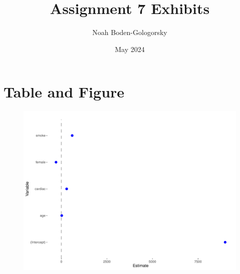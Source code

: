 \documentclass{article}
\title{Assignment 7 Exhibits}
\author{Noah Boden-Gologorsky}
\date{May 2024}
\begin{document}
\maketitle
\section{Table and Figure}
\begin{center}



\bigskip

\begin{figure}[h]
  \includegraphics[width=1\textwidth]{coefficient_plot.pdf}
\end{figure}
\end{center}
\end{document}
